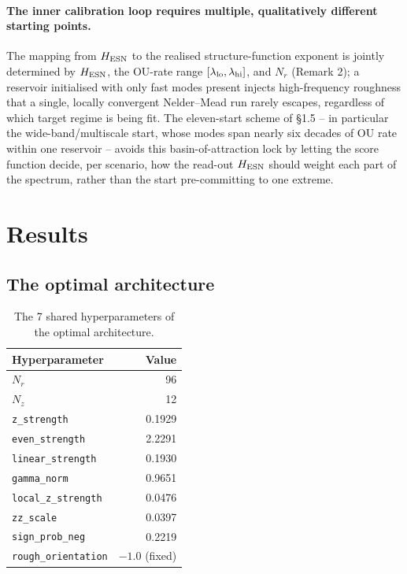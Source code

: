 \documentclass[11pt,a4paper]{article}
\begin{document}
\paragraph{The inner calibration loop requires multiple, qualitatively
different starting points.} The mapping from $H_{\rm ESN}$ to the
realised structure-function exponent is jointly determined by
$H_{\rm ESN}$, the OU-rate range $[\lambda_{\rm lo},\lambda_{\rm hi}]$,
and $N_r$ (Remark 2); a reservoir initialised with only fast modes
present injects high-frequency roughness that a single, locally
convergent Nelder--Mead run rarely escapes, regardless of which target
regime is being fit. The eleven-start scheme of \S1.5 -- in particular
the wide-band/multiscale start, whose modes span nearly six decades of
OU rate within one reservoir -- avoids this basin-of-attraction lock by
letting the score function decide, per scenario, how the read-out
$H_{\rm ESN}$ should weight each part of the spectrum, rather than the
start pre-committing to one extreme.

\section{Results}

\subsection{The optimal architecture}
\label{sec:optarch}

\begin{center}
\renewcommand{\arraystretch}{1.3}
\end{center}

\begin{table}[h]
\centering
\caption{The 7 shared hyperparameters of the optimal architecture.}
\label{tab:optarch}
\begin{tabular}{@{}lr@{}}
\toprule
Hyperparameter & Value \\
\midrule
$N_r$ & 96 \\
$N_z$ & 12 \\
\texttt{z\_strength} & 0.1929 \\
\texttt{even\_strength} & 2.2291 \\
\texttt{linear\_strength} & 0.1930 \\
\texttt{gamma\_norm} & 0.9651 \\
\texttt{local\_z\_strength} & 0.0476 \\
\texttt{zz\_scale} & 0.0397 \\
\texttt{sign\_prob\_neg} & 0.2219 \\
\texttt{rough\_orientation} & $-1.0$ (fixed) \\
\bottomrule
\end{tabular}
\end{table}
\end{document}
